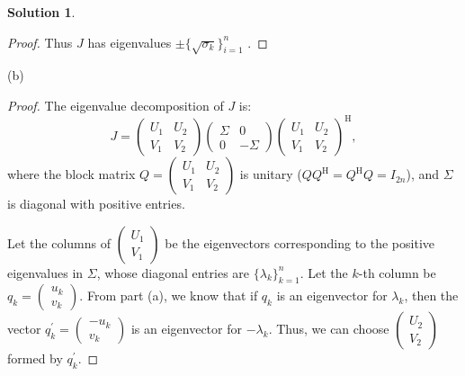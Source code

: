 \documentclass[12pt]{article}
\theoremstyle{definition}
\newtheorem*{solution}{\normalfont\textbf{Solution}}
\begin{document}
\begin{enumerate}[leftmargin=*]
\begin{solution}
\begin{proof}
                Thus \( J \) has eigenvalues \( \pm \{\sqrt{\sigma_k}\}_{i=1}^{n} \) .
            \end{proof}
        \item[(b)]
            \begin{proof}
                The eigenvalue decomposition of \(J\) is:
                \[
                J = \begin{pmatrix} U_1 & U_2 \\ V_1 & V_2 \end{pmatrix} \begin{pmatrix} \Sigma & 0 \\ 0 & -\Sigma \end{pmatrix} \begin{pmatrix} U_1 & U_2 \\ V_1 & V_2 \end{pmatrix}^{\mathrm{H}},
                \]
                where the block matrix \(Q = \begin{pmatrix} U_1 & U_2 \\ V_1 & V_2 \end{pmatrix}\) is unitary (\(Q Q^{\mathrm{H}} = Q^{\mathrm{H}} Q = I_{2n}\)), and \(\Sigma\) is diagonal with positive entries.

                Let the columns of \(\begin{pmatrix} U_1 \\ V_1 \end{pmatrix}\) be the eigenvectors corresponding to the positive eigenvalues in \(\Sigma\), whose diagonal entries are \(\{\lambda_k\}_{k=1}^n\). Let the \(k\)-th column be \(q_k = \begin{pmatrix} u_k \\ v_k \end{pmatrix}\). From part (a), we know that if $q_k$ is an eigenvector for $\lambda_k$, then the vector $q^{'}_k = \begin{pmatrix} -u_k \\ v_k \end{pmatrix}$ is an eigenvector for \(-\lambda_k\).
                Thus, we can choose \(\begin{pmatrix} U_2 \\ V_2 \end{pmatrix}\) formed by \(q^{'}_k\).


\end{proof}
\end{solution}
\end{enumerate}
\end{document}

